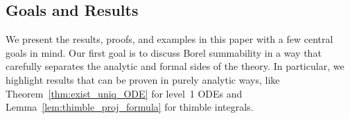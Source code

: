 \documentclass{article}
\newcommand{\series}[1]{\tilde{#1}}
\newcommand{\laplace}{\mathcal{L}}
\newcommand{\borel}{\mathcal{B}}
\theoremstyle{definition}
\theoremstyle{plain}
\begin{document}



\subsection{Goals and Results}
%
We present the results, proofs, and examples in this paper with a few central goals in mind. Our first goal is to discuss Borel summability in a way that carefully separates the analytic and formal sides of the theory. In particular, we highlight results that can be proven in purely analytic ways, like Theorem~\ref{thm:exist_uniq_ODE} for level~1 ODEs and Lemma~\ref{lem:thimble_proj_formula} for thimble integrals.
\end{document}
